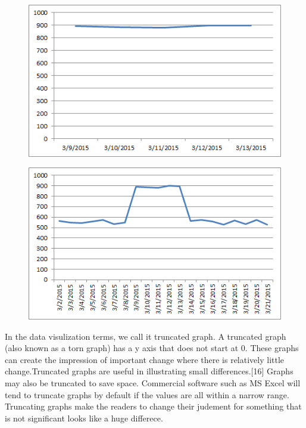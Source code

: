 \documentclass[]{book}
\theoremstyle{definition}
\theoremstyle{definition}
\theoremstyle{definition}
\theoremstyle{remark}
\begin{document}
\begin{figure}
\centering
\includegraphics{images/Bad_graph_extraction.png}
\caption{}
\end{figure}

\begin{figure}
\centering
\includegraphics{images/Good_graph_extraction.png}
\caption{}
\end{figure}

In the data visulization terms, we call it truncated graph. A truncated
graph (also known as a torn graph) has a y axis that does not start at
0. These graphs can create the impression of important change where
there is relatively little change.Truncated graphs are useful in
illustrating small differences.{[}16{]} Graphs may also be truncated to
save space. Commercial software such as MS Excel will tend to truncate
graphs by default if the values are all within a narrow range.
Truncating graphs make the readers to change their judement for
something that is not significant looks like a huge differece.
\end{document}
